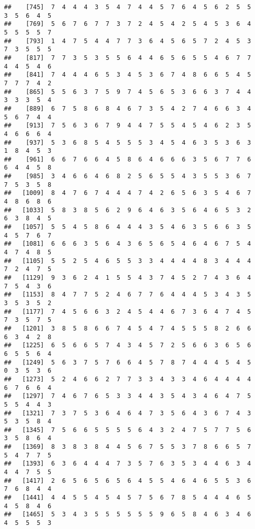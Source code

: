 \documentclass[
]{book}
\begin{document}
\begin{verbatim}
##    [745]  7  4  4  4  3  5  4  7  4  4  5  7  6  4  5  6  2  5  5  3  5  6  4  5
##    [769]  5  6  7  6  7  7  3  7  2  4  5  4  2  5  4  5  3  6  4  5  5  5  5  7
##    [793]  1  4  7  5  4  4  7  7  3  6  4  5  6  5  7  2  4  5  3  7  3  5  5  5
##    [817]  7  7  3  5  3  5  5  6  4  4  6  5  6  5  5  4  6  7  7  4  4  5  4  6
##    [841]  7  4  4  4  6  5  3  4  5  3  6  7  4  8  6  6  5  4  5  7  7  7  4  2
##    [865]  5  5  6  3  7  5  9  7  4  5  6  5  3  6  6  3  7  4  4  3  3  3  5  4
##    [889]  6  7  5  8  6  8  4  6  7  3  5  4  2  7  4  6  6  3  4  5  6  7  4  4
##    [913]  7  5  6  3  6  7  9  4  4  7  5  5  4  5  4  6  2  3  5  4  6  6  6  4
##    [937]  5  3  6  8  5  4  5  5  5  3  4  5  4  6  3  5  3  6  3  1  8  4  5  3
##    [961]  6  6  7  6  6  4  5  8  6  4  6  6  6  3  5  6  7  7  6  6  4  4  5  8
##    [985]  3  4  6  6  4  6  8  2  5  6  5  5  4  3  5  5  3  6  7  7  5  3  5  8
##   [1009]  8  4  7  6  7  4  4  4  7  4  2  6  5  6  3  5  4  6  7  4  8  6  8  6
##   [1033]  5  8  3  8  5  6  2  9  6  4  6  3  5  6  4  6  5  3  2  6  3  8  4  5
##   [1057]  5  5  4  5  8  6  4  4  4  3  5  4  6  3  5  6  6  3  5  4  5  7  6  7
##   [1081]  6  6  6  3  5  6  4  3  6  5  6  5  4  6  4  6  7  5  4  4  7  4  8  5
##   [1105]  5  5  2  5  4  6  5  5  3  3  4  4  4  4  8  3  4  4  4  7  2  4  7  5
##   [1129]  9  3  6  2  4  1  5  5  4  3  7  4  5  2  7  4  3  6  4  7  5  4  3  6
##   [1153]  8  4  7  7  5  2  4  6  7  7  6  4  4  4  5  3  4  3  5  3  5  3  5  2
##   [1177]  7  4  5  6  6  3  2  4  5  4  4  6  7  3  6  4  7  4  5  7  3  5  7  5
##   [1201]  3  8  5  8  6  6  7  4  5  4  7  4  5  5  5  8  2  6  6  6  3  4  2  8
##   [1225]  6  5  6  6  5  7  4  3  4  5  7  2  5  6  6  3  6  5  6  6  5  5  6  4
##   [1249]  5  6  3  7  5  7  6  6  4  5  7  8  7  4  4  4  5  4  5  0  3  5  3  6
##   [1273]  5  2  4  6  6  2  7  7  3  3  4  3  3  4  6  4  4  4  4  6  7  6  6  4
##   [1297]  7  4  6  7  6  5  3  3  4  4  3  5  4  3  4  6  4  7  5  5  5  4  4  3
##   [1321]  7  3  7  5  3  6  4  6  4  7  3  5  6  4  3  6  7  4  3  5  3  5  8  4
##   [1345]  7  5  6  6  5  5  5  5  6  4  3  2  4  7  5  7  7  5  6  3  5  8  6  4
##   [1369]  8  3  8  3  8  4  4  5  6  7  5  5  3  7  8  6  6  5  7  5  4  7  7  5
##   [1393]  6  3  6  4  4  4  7  3  5  7  6  3  5  3  4  4  6  3  4  4  4  7  5  5
##   [1417]  2  6  5  6  5  6  5  6  4  5  5  4  6  4  6  5  5  3  6  7  6  8  4  4
##   [1441]  4  4  5  5  4  5  4  5  7  5  6  7  8  5  4  4  4  6  5  4  5  8  4  6
##   [1465]  5  3  4  3  5  5  5  5  5  5  9  6  5  8  4  6  3  4  6  4  5  5  5  3

\end{verbatim}
\end{document}
